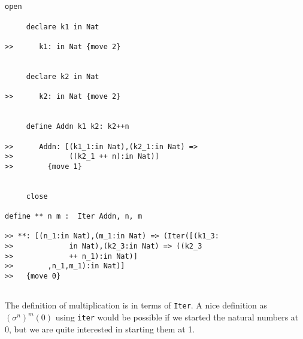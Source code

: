 \documentclass[12pt]{article}
\begin{document}
\begin{verbatim}


open

     declare k1 in Nat

>>      k1: in Nat {move 2}


     declare k2 in Nat

>>      k2: in Nat {move 2}


     define Addn k1 k2: k2++n

>>      Addn: [(k1_1:in Nat),(k2_1:in Nat) => 
>>             ((k2_1 ++ n):in Nat)]
>>        {move 1}


     close

define ** n m :  Iter Addn, n, m

>> **: [(n_1:in Nat),(m_1:in Nat) => (Iter([(k1_3:
>>             in Nat),(k2_3:in Nat) => ((k2_3 
>>             ++ n_1):in Nat)]
>>        ,n_1,m_1):in Nat)]
>>   {move 0}


\end{verbatim}

The definition of multiplication is in terms of {\tt Iter}.  A nice definition as $(\sigma^n)^m(0)$ using {\tt iter} would be possible if we started
the natural numbers at 0, but we are quite interested in starting them at 1.
\end{document}
